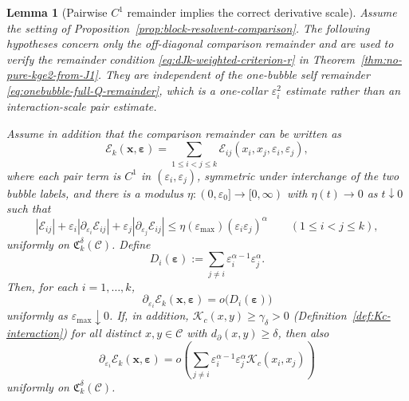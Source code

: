 \documentclass[11pt,reqno,a4paper]{amsart}
\numberwithin{equation}{section}
\theoremstyle{plain}
\newtheorem{lemma}[theorem]{Lemma}
\theoremstyle{remark}
\theoremstyle{plain}
\begin{document}
\begin{lemma}[Pairwise $C^1$ remainder implies the correct derivative scale]
\label{lem:pairwise-C1-remainder}
Assume the setting of Proposition~\ref{prop:block-resolvent-comparison}.  The
following hypotheses concern only the off-diagonal comparison remainder and are
used to verify the remainder condition \eqref{eq:dJk-weighted-criterion-r} in
Theorem~\ref{thm:no-pure-kge2-from-J1}.  They are independent of the one-bubble
self remainder \eqref{eq:onebubble-full-Q-remainder}, which is a one-collar
$\varepsilon_i^2$ estimate rather than an interaction-scale pair estimate.

Assume in addition that the comparison remainder can be written as
\[
\mathcal E_k(\mathbf x,\boldsymbol\varepsilon)
=\sum_{1\le i<j\le k}\mathcal E_{ij}(x_i,x_j,\varepsilon_i,\varepsilon_j),
\]
where each pair term is $C^1$ in $(\varepsilon_i,\varepsilon_j)$, symmetric under interchange
of the two bubble labels, and there is a modulus
$\eta:(0,\varepsilon_0]\to[0,\infty)$ with $\eta(t)\to0$ as $t\downarrow0$ such that
\begin{equation}\label{eq:pairwise-C1-remainder-bound}
|\mathcal E_{ij}|
+\varepsilon_i|\partial_{\varepsilon_i}\mathcal E_{ij}|
+\varepsilon_j|\partial_{\varepsilon_j}\mathcal E_{ij}|
\le
\eta(\varepsilon_{\max})(\varepsilon_i\varepsilon_j)^{\alpha}
\qquad (1\le i<j\le k),
\end{equation}
uniformly on $\mathfrak C_k^\delta(\mathcal C)$.
Define
\[
D_i(\boldsymbol\varepsilon)
:=\sum_{j\neq i}\varepsilon_i^{\alpha-1}\varepsilon_j^{\alpha}.
\]
Then, for each $i=1,\dots,k$,
\begin{equation}\label{eq:pairwise-derivative-little-o}
\partial_{\varepsilon_i}\mathcal E_k(\mathbf x,\boldsymbol\varepsilon)
=o\big(D_i(\boldsymbol\varepsilon)\big)
\end{equation}
uniformly as $\varepsilon_{\max}\downarrow0$.
If, in addition,
$\mathcal K_c(x,y)\ge \gamma_\delta>0$
(Definition~\ref{def:Kc-interaction})
for all distinct $x,y\in\mathcal C$ with $d_\partial(x,y)\ge\delta$,
then also
\begin{equation}\label{eq:pairwise-derivative-little-o-G}
\partial_{\varepsilon_i}\mathcal E_k(\mathbf x,\boldsymbol\varepsilon)
=o\left(\sum_{j\neq i}\varepsilon_i^{\alpha-1}\varepsilon_j^{\alpha}
\mathcal K_c(x_i,x_j)\right)
\end{equation}
uniformly on $\mathfrak C_k^\delta(\mathcal C)$.
\end{lemma}
\end{document}
